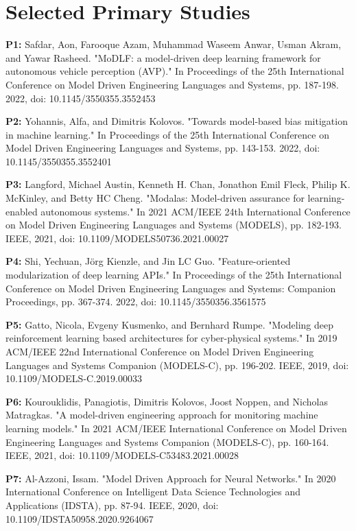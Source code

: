 \appendix
\section{Selected Primary Studies}

\begin{footnotesize}
\textbf{P1:} Safdar, Aon, Farooque Azam, Muhammad Waseem Anwar, Usman Akram, and Yawar Rasheed. "MoDLF: a model-driven deep learning framework for autonomous vehicle perception (AVP)." In Proceedings of the 25th International Conference on Model Driven Engineering Languages and Systems, pp. 187-198. 2022, doi: 10.1145/3550355.3552453

\textbf{P2:} Yohannis, Alfa, and Dimitris Kolovos. "Towards model-based bias mitigation in machine learning." In Proceedings of the 25th International Conference on Model Driven Engineering Languages and Systems, pp. 143-153. 2022, doi: 10.1145/3550355.3552401

\textbf{P3:} Langford, Michael Austin, Kenneth H. Chan, Jonathon Emil Fleck, Philip K. McKinley, and Betty HC Cheng. "Modalas: Model-driven assurance for learning-enabled autonomous systems." In 2021 ACM/IEEE 24th International Conference on Model Driven Engineering Languages and Systems (MODELS), pp. 182-193. IEEE, 2021, doi: 10.1109/MODELS50736.2021.00027

\textbf{P4:} Shi, Yechuan, Jörg Kienzle, and Jin LC Guo. "Feature-oriented modularization of deep learning APIs." In Proceedings of the 25th International Conference on Model Driven Engineering Languages and Systems: Companion Proceedings, pp. 367-374. 2022, doi: 10.1145/3550356.3561575

\textbf{P5:} Gatto, Nicola, Evgeny Kusmenko, and Bernhard Rumpe. "Modeling deep reinforcement learning based architectures for cyber-physical systems." In 2019 ACM/IEEE 22nd International Conference on Model Driven Engineering Languages and Systems Companion (MODELS-C), pp. 196-202. IEEE, 2019, doi: 10.1109/MODELS-C.2019.00033

\textbf{P6:} Kourouklidis, Panagiotis, Dimitris Kolovos, Joost Noppen, and Nicholas Matragkas. "A model-driven engineering approach for monitoring machine learning models." In 2021 ACM/IEEE International Conference on Model Driven Engineering Languages and Systems Companion (MODELS-C), pp. 160-164. IEEE, 2021, doi: 10.1109/MODELS-C53483.2021.00028

\textbf{P7:} Al-Azzoni, Issam. "Model Driven Approach for Neural Networks." In 2020 International Conference on Intelligent Data Science Technologies and Applications (IDSTA), pp. 87-94. IEEE, 2020, doi: 10.1109/IDSTA50958.2020.9264067


\end{footnotesize}

